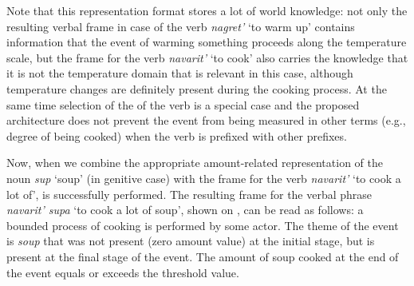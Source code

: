 Note that this representation format stores a lot of world knowledge: not only the resulting verbal frame in case of the verb \textit{nagret'} `to warm up' contains information that the event of warming something proceeds along the temperature scale, but the frame for the verb \textit{navarit'} `to cook' also carries the knowledge that it is not the temperature domain that is relevant in this case, although temperature changes are definitely present during the cooking process. At the same time selection of the  of the verb is a special case and the proposed architecture does not prevent the event from being measured in other terms (e.g., degree of being cooked) when the verb is prefixed with other prefixes.

Now, when we combine the appropriate amount-related representation of the noun \textit{sup} `soup' (in genitive case) with the frame for the verb \textit{navarit'} `to cook a lot of',  is successfully performed. The resulting frame for the verbal phrase \textit{navarit' supa} `to cook a lot of soup', shown on , can be read as follows: a bounded process of cooking is performed by some actor. The theme of the event is \textit{soup} that was not present (zero amount value) at the initial stage, but is present at the final stage of the event. The amount of soup cooked at the end of the event equals or exceeds the threshold value. 

